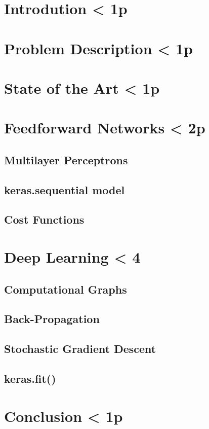 \documentclass{article}
\begin{document}
    \section{Introdution < 1p}
    \section{Problem Description < 1p}
    \section{State of the Art < 1p}

    \section{Feedforward Networks < 2p}
    \subsection{Multilayer Perceptrons}
    \subsection{keras.sequential model}
    \subsection{Cost Functions}

    \section{Deep Learning < 4}
    \subsection{Computational Graphs}
    \subsection{Back-Propagation}
    \subsection{Stochastic Gradient Descent}
    \subsection{keras.fit()}

    \section{Conclusion < 1p}
\end{document}

